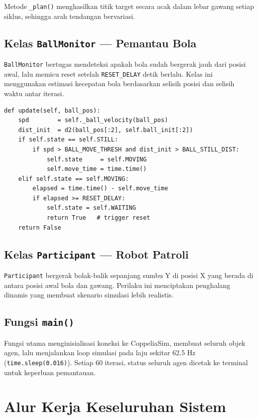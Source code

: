 \documentclass{article}
\begin{document}
Metode \texttt{\_plan()} menghasilkan titik target secara acak dalam lebar
gawang setiap siklus, sehingga arah tendangan bervariasi.

\subsection{Kelas \texttt{BallMonitor} — Pemantau Bola}

\texttt{BallMonitor} bertugas mendeteksi apakah bola sudah bergerak jauh dari
posisi awal, lalu memicu reset setelah \texttt{RESET\_DELAY} detik berlalu.
Kelas ini menggunakan estimasi kecepatan bola berdasarkan selisih posisi dan
selisih waktu antar iterasi.

\begin{verbatim}
def update(self, ball_pos):
    spd        = self._ball_velocity(ball_pos)
    dist_init  = d2(ball_pos[:2], self.ball_init[:2])
    if self.state == self.STILL:
        if spd > BALL_MOVE_THRESH and dist_init > BALL_STILL_DIST:
            self.state     = self.MOVING
            self.move_time = time.time()
    elif self.state == self.MOVING:
        elapsed = time.time() - self.move_time
        if elapsed >= RESET_DELAY:
            self.state = self.WAITING
            return True   # trigger reset
    return False
\end{verbatim}

\subsection{Kelas \texttt{Participant} — Robot Patroli}

\texttt{Participant} bergerak bolak-balik sepanjang sumbu Y di posisi X yang
berada di antara posisi awal bola dan gawang. Perilaku ini menciptakan penghalang
dinamis yang membuat skenario simulasi lebih realistis.

\subsection{Fungsi \texttt{main()}}

Fungsi utama menginisialisasi koneksi ke CoppeliaSim, membuat seluruh objek
agen, lalu menjalankan loop simulasi pada laju sekitar 62.5 Hz
(\texttt{time.sleep(0.016)}). Setiap 60 iterasi, status seluruh agen dicetak
ke terminal untuk keperluan pemantauan.

\section{Alur Kerja Keseluruhan Sistem}
\end{document}
